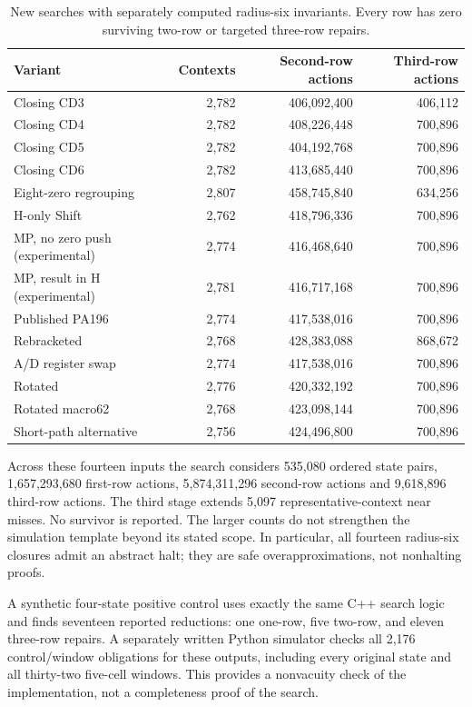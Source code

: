 \begin{table}[ht]
\centering\small
\begin{tabular}{@{}lrrr@{}}
\toprule
Variant & Contexts & Second-row actions & Third-row actions \\
\midrule
Closing CD3 & 2,782 & 406,092,400 & 406,112 \\
Closing CD4 & 2,782 & 408,226,448 & 700,896 \\
Closing CD5 & 2,782 & 404,192,768 & 700,896 \\
Closing CD6 & 2,782 & 413,685,440 & 700,896 \\
Eight-zero regrouping & 2,807 & 458,745,840 & 634,256 \\
H-only Shift & 2,762 & 418,796,336 & 700,896 \\
MP, no zero push (experimental) & 2,774 & 416,468,640 & 700,896 \\
MP, result in H (experimental) & 2,781 & 416,717,168 & 700,896 \\
Published PA196 & 2,774 & 417,538,016 & 700,896 \\
Rebracketed & 2,768 & 428,383,088 & 868,672 \\
A/D register swap & 2,774 & 417,538,016 & 700,896 \\
Rotated & 2,776 & 420,332,192 & 700,896 \\
Rotated macro62 & 2,768 & 423,098,144 & 700,896 \\
Short-path alternative & 2,756 & 424,496,800 & 700,896 \\
\bottomrule
\end{tabular}
\caption{New searches with separately computed radius-six invariants.
Every row has zero surviving two-row or targeted three-row repairs.}
\end{table}

Across these fourteen inputs the search considers 535,080 ordered
state pairs, 1,657,293,680 first-row actions,
5,874,311,296 second-row actions and 9,618,896
third-row actions. The third stage extends 5,097
representative-context near misses. No survivor is reported. The larger
counts do not strengthen the simulation template beyond its stated scope.
In particular, all fourteen radius-six closures admit an abstract halt;
they are safe overapproximations, not nonhalting proofs.

A synthetic four-state positive control uses exactly the same C++ search
logic and finds seventeen reported reductions: one one-row, five two-row,
and eleven three-row repairs. A separately written Python simulator checks
all 2,176 control/window obligations for these outputs, including every
original state and all thirty-two five-cell windows. This provides a
nonvacuity check of the implementation, not a completeness proof of the search.
